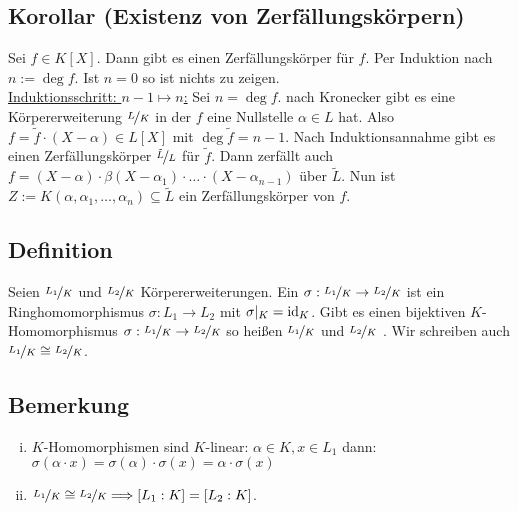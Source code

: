 \subsection{Korollar (Existenz von Zerfällungskörpern)} %
\label{sub:145}
Sei $f \in K[X]$. Dann gibt es einen Zerfällungskörper für $f$.
Per Induktion nach $n := \deg f$. Ist $n=0$ so ist nichts zu zeigen.\\
\uline{Induktionsschritt: $n-1 \mapsto n$:} Sei $n= \deg f$. nach Kronecker gibt es eine Körpererweiterung $\nicefrac{L}{K}$ in der $f$ eine Nullstelle $\alpha \in L$ hat.
Also $f= \tilde f \cdot (X-\alpha) \in L[X]$ mit $\deg \tilde f = n-1$. Nach Induktionsannahme gibt es einen Zerfällungskörper $\nicefrac{\tilde L}{L}$ für $\tilde f$.
Dann zerfällt auch $f= (X- \alpha) \cdot \beta (X- \alpha_1) \cdot \ldots \cdot (X- \alpha_{n-1})$ über $\tilde L$. Nun ist 
$Z := K(\alpha, \alpha_1, \ldots , \alpha_n) \subseteq \tilde L$ ein Zerfällungskörper von $f$. \bewende

\subsection[Definition: $K$-Homomorphismus]{Definition} %
\label{sub:146}
Seien $\nicefrac{L_1}{K}$ und $\nicefrac{L_2}{K}$ Körpererweiterungen. Ein  $\sigma : \nicefrac{L_1}{K} \to \nicefrac{L_2}{K}$ ist ein 
Ringhomomorphismus $\sigma : L_1 \to L_2$ mit $\sigma|_K = \operatorname{id}_K$. Gibt es einen bijektiven $K$-Homomorphismus $\sigma : \nicefrac{L_1}{K} \to \nicefrac{L_2}{K}$ so
heißen $\nicefrac{L_1}{K}$ und $\nicefrac{L_2}{K}$ . Wir schreiben auch $\nicefrac{L_1}{K} \cong \nicefrac{L_2}{K}$. 

\subsection[Bemerkung: Eigenschaften von $K$-Homomorphismen]{Bemerkung} %
\label{sub:147}
\begin{enumerate}[(i)]
	\item $K$-Homomorphismen sind $K$-linear: $\alpha \in K, x \in L_1$ dann: $\sigma(\alpha \cdot x) = \sigma(\alpha) \cdot \sigma(x) = \alpha \cdot \sigma(x)$
	\item $\nicefrac{L_1}{K} \cong \nicefrac{L_2}{K} \Longrightarrow [L_1 :K ] = [L_2 : K]$.
\end{enumerate}

